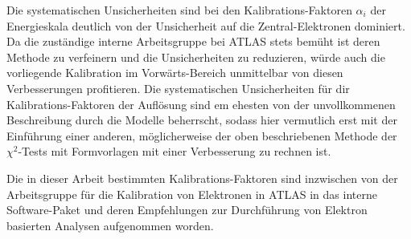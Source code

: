 Die systematischen Unsicherheiten sind bei den Kalibrations-Faktoren $\alpha_i$
der Energieskala deutlich von der Unsicherheit auf die Zentral-Elektronen
dominiert. Da die zuständige interne Arbeitsgruppe bei ATLAS stets bemüht ist
deren Methode zu verfeinern und die Unsicherheiten zu reduzieren, würde
auch die vorliegende Kalibration im Vorwärts-Bereich unmittelbar von diesen
Verbesserungen profitieren. Die systematischen Unsicherheiten für dir
Kalibrations-Faktoren der Auflösung sind em ehesten von der unvollkommenen
Beschreibung durch die Modelle beherrscht, sodass hier vermutlich erst mit der
Einführung einer anderen, möglicherweise der oben beschriebenen Methode der
$\chi^2$-Tests mit Formvorlagen mit einer Verbesserung zu rechnen ist.

Die in dieser Arbeit bestimmten Kalibrations-Faktoren sind inzwischen von der
Arbeitsgruppe für die Kalibration von Elektronen in ATLAS in das interne 
Software-Paket und deren Empfehlungen zur Durchführung von Elektron basierten
Analysen aufgenommen worden.

